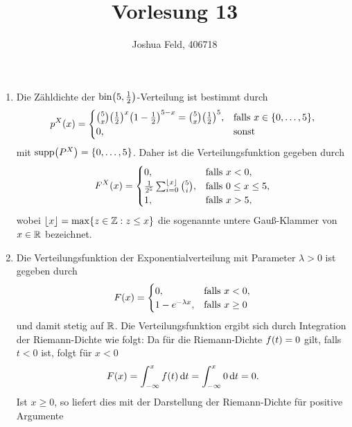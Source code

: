 \documentclass{lecture}
\institute{Institut für Statistik und Wirtschaftsmathematik}
\title{Vorlesung 13}
\author{Joshua Feld, 406718}
\begin{document}
    \maketitle


    \begin{example}
        \begin{enumerate}
            \item Die Zähldichte der \(\bin\parentheses*{5, \frac{1}{2}}\)-Verteilung ist bestimmt durch
            \[
                p^X\parentheses*{x} = \begin{cases}
                    \binom{5}{x}\parentheses*{\frac{1}{2}}^x \parentheses*{1 - \frac{1}{2}}^{5 - x} = \binom{5}{x}\parentheses*{\frac{1}{2}}^5, & \text{falls }x \in \braces*{0, \ldots, 5},\\
                    0, & \text{sonst}
                \end{cases}
            \]
            mit \(\supp\parentheses*{P^X} = \braces*{0, \ldots, 5}\).
            Daher ist die Verteilungsfunktion gegeben durch
            \[
                F^X\parentheses*{x} = \begin{cases}
                    0, & \text{falls }x < 0,\\
                    \frac{1}{2^5}\sum_{i = 0}^{\floor*{x}}\binom{5}{i}, & \text{falls }0 \le x \le 5,\\
                    1, & \text{falls }x > 5,
                \end{cases}
            \]
            wobei \(\floor*{x} = \max\braces*{z \in \Z : z \le x}\) die sogenannte untere Gauß-Klammer von \(x \in \mathbb{R}\) bezeichnet.
            \item Die Verteilungsfunktion der Exponentialverteilung mit Parameter \(\lambda > 0\) ist gegeben durch
            \[
                F\parentheses*{x} = \begin{cases}
                    0, & \text{falls }x < 0,\\
                    1 - e^{-\lambda x}, & \text{falls }x \ge 0
                \end{cases}
            \]
            und damit stetig auf \(\mathbb{R}\).
            Die Verteilungsfunktion ergibt sich durch Integration der Riemann-Dichte wie folgt: Da für die Riemann-Dichte \(f\parentheses*{t} = 0\) gilt, falls \(t < 0\) ist, folgt für \(x < 0\)
            \[
                F\parentheses*{x} = \int_{-\infty}^x f\parentheses*{t}\d t = \int_{-\infty}^x 0\d t = 0.
            \]
            Ist \(x \ge 0\), so liefert dies mit der Darstellung der Riemann-Dichte für positive Argumente

\end{enumerate}
\end{example}
\end{document}
